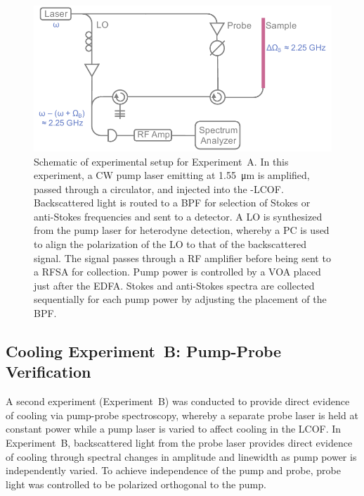 \begin{figure}[t]
  \centering
  \includegraphics[width=\textwidth]{figs/2-Cooling/pumpOnlyDesign.pdf}
  \caption{Schematic of experimental setup for Experiment~A. In this experiment, a \ac{CW} pump laser emitting at \SI{1.55}{\micro\meter} is amplified, passed through a circulator, and injected into the -\ac{LCOF}. Backscattered light is routed to a \ac{BPF} for selection of Stokes or anti-Stokes frequencies and sent to a detector. A \ac{LO} is synthesized from the pump laser for heterodyne detection, whereby a \acl{PC} is used to align the polarization of the \ac{LO} to that of the backscattered signal. The signal passes through a \acl{RF} amplifier before being sent to a \ac{RFSA} for collection. Pump power is controlled by a \ac{VOA} placed just after the \ac{EDFA}. Stokes and anti-Stokes spectra are collected sequentially for each pump power by adjusting the placement of the \ac{BPF}.}
  \label{fig:Cooling:ExperimentADesign}
\end{figure}

\subsection{Cooling Experiment~B: Pump-Probe Verification}
\label{Cooling:subsec:ExperimentBPump-ProbeVerification}

A second experiment (Experiment~B) was conducted to provide direct evidence of cooling via pump-probe spectroscopy, whereby a separate probe laser is held at constant power while a pump laser is varied to affect cooling in the \ac{LCOF}. In Experiment~B, backscattered light from the probe laser provides direct evidence of cooling through spectral changes in amplitude and linewidth as pump power is independently varied. To achieve independence of the pump and probe, probe light was controlled to be polarized orthogonal to the pump.

